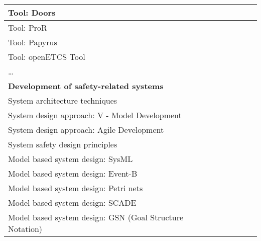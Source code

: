 \documentclass[a4paper, 11pt]{article}
\begin{document}
\begin{center}
\begin{longtable}{|r|r|r|r|r|r|r|r|}
    \hline
    \multicolumn{1}{|l|}{Tool: Doors } & \multicolumn{1}{l|}{} &       &       &       &       &       &  \bigstrut\\
    \hline
    \multicolumn{1}{|l|}{Tool: ProR} & \multicolumn{1}{l|}{} &       &       &       &       &       &  \bigstrut\\
    \hline
    \multicolumn{1}{|l|}{Tool: Papyrus} & \multicolumn{1}{l|}{} &       &       &       &       &       &  \bigstrut\\
    \hline
    \multicolumn{1}{|l|}{Tool: openETCS Tool} & \multicolumn{1}{l|}{} &       &       &       &       &       &  \bigstrut\\
    \hline    
    \multicolumn{1}{|l|}{…} & \multicolumn{1}{l|}{} &       &       &       &       &       &  \bigstrut[t]\\
    \hline    
    \multicolumn{1}{|l|}{\textbf{Development of safety-related systems}} & \multicolumn{1}{c|}{\textbf{}} &       &       &       &       &       &  \\
    \multicolumn{1}{|l|}{System architecture techniques} & \multicolumn{1}{c|}{} &       &       &       &       &       &  \bigstrut[b]\\
    \hline
    \multicolumn{1}{|l|}{System design approach: V - Model Development} & \multicolumn{1}{c|}{} &       &       &       &       &       &  \bigstrut\\
    \hline
    \multicolumn{1}{|l|}{System design approach: Agile Development} & \multicolumn{1}{c|}{} &       &       &       &       &       &  \bigstrut\\
    \hline
    \multicolumn{1}{|l|}{System safety design principles} & \multicolumn{1}{c|}{} &       &       &       &       &       &  \bigstrut\\
    \hline
    \multicolumn{1}{|l|}{Model based system design: SysML} & \multicolumn{1}{c|}{} &       &       &       &       &       &  \bigstrut\\
    \hline
    \multicolumn{1}{|l|}{Model based system design: Event-B} & \multicolumn{1}{c|}{} &       &       &       &       &       &  \bigstrut\\
    \hline
    \multicolumn{1}{|l|}{Model based system design: Petri nets} & \multicolumn{1}{c|}{} &       &       &       &       &       &  \bigstrut\\
    \hline
    \multicolumn{1}{|l|}{Model based system design: SCADE} & \multicolumn{1}{c|}{} &       &       &       &       &       &  \bigstrut\\
    \hline
    \multicolumn{1}{|l|}{Model based system design: GSN (Goal Structure Notation)} & \multicolumn{1}{c|}{} &       &       &       &       &       &  \bigstrut\\

\end{longtable}
\end{center}
\end{document}
